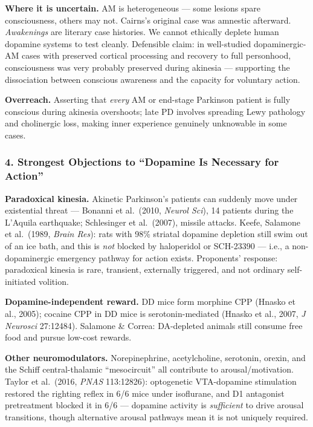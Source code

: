 \textbf{Where it is uncertain.} AM is heterogeneous --- some lesions spare consciousness, others may not. Cairns's original case was amnestic afterward. \emph{Awakenings} are literary case histories. We cannot ethically deplete human dopamine systems to test cleanly. Defensible claim: in well-studied dopaminergic-AM cases with preserved cortical processing and recovery to full personhood, consciousness was very probably preserved during akinesia --- supporting the dissociation between conscious awareness and the capacity for voluntary action.

\textbf{Overreach.} Asserting that \emph{every} AM or end-stage Parkinson patient is fully conscious during akinesia overshoots; late PD involves spreading Lewy pathology and cholinergic loss, making inner experience genuinely unknowable in some cases.

\subsubsection{4. Strongest Objections to ``Dopamine Is Necessary for Action''}\label{02_dopamine_action-strongest-objections-to-dopamine-is-necessary-for-action}

\textbf{Paradoxical kinesia.} Akinetic Parkinson's patients can suddenly move under existential threat --- Bonanni et al.~(2010, \emph{Neurol Sci}), 14 patients during the L'Aquila earthquake; Schlesinger et al.~(2007), missile attacks. Keefe, Salamone et al.~(1989, \emph{Brain Res}): rats with 98\% striatal dopamine depletion still swim out of an ice bath, and this is \emph{not} blocked by haloperidol or SCH-23390 --- i.e., a non-dopaminergic emergency pathway for action exists. Proponents' response: paradoxical kinesia is rare, transient, externally triggered, and not ordinary self-initiated volition.

\textbf{Dopamine-independent reward.} DD mice form morphine CPP (Hnasko et al., 2005); cocaine CPP in DD mice is serotonin-mediated (Hnasko et al., 2007, \emph{J Neurosci} 27:12484). Salamone \& Correa: DA-depleted animals still consume free food and pursue low-cost rewards.

\textbf{Other neuromodulators.} Norepinephrine, acetylcholine, serotonin, orexin, and the Schiff central-thalamic ``mesocircuit'' all contribute to arousal/motivation. Taylor et al.~(2016, \emph{PNAS} 113:12826): optogenetic VTA-dopamine stimulation restored the righting reflex in 6/6 mice under isoflurane, and D1 antagonist pretreatment blocked it in 6/6 --- dopamine activity is \emph{sufficient} to drive arousal transitions, though alternative arousal pathways mean it is not uniquely required.


